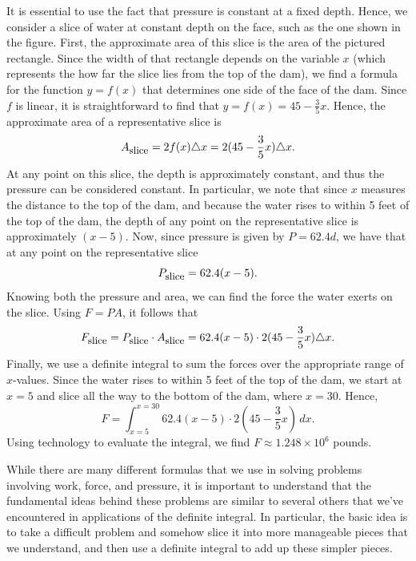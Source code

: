 It is essential to use the fact that pressure is constant at a fixed depth.  Hence, we consider a slice of water at constant depth on the face, such as the one shown in the figure.  First, the approximate area of this slice is the area of the pictured rectangle.  Since the width of that rectangle depends on the variable $x$ (which represents the how far the slice lies from the top of the dam), we find a formula for the function $y = f(x)$ that determines one side of the face of the dam.  Since $f$ is linear, it is straightforward to find that $y = f(x) = 45 - \frac{3}{5}x$.  Hence, the approximate area of a representative slice is
$$A_{\mbox{\small{slice}}} = 2 f(x) \triangle x = 2 (45 - \frac{3}{5}x) \triangle x.$$
At any point on this slice, the depth is approximately constant, and thus the pressure can be considered constant.  In particular, we note that since $x$ measures the distance to the top of the dam, and because the water rises to within 5 feet of the top of the dam, the depth of any point on the representative slice is approximately $(x-5)$.  Now, since pressure is given by $P = 62.4d$, we have that at any point on the representative slice
$$P_{\mbox{\small{slice}}} = 62.4(x-5).$$
Knowing both the pressure and area, we can find the force the water exerts on the slice.  Using $F = PA$, it follows that 
$$F_{\mbox{\small{slice}}} = P_{\mbox{\small{slice}}} \cdot A_{\mbox{\small{slice}}} = 62.4(x-5) \cdot 2 (45 - \frac{3}{5}x) \triangle x.$$
Finally, we use a definite integral to sum the forces over the appropriate range of $x$-values.  Since the water rises to within 5 feet of the top of the dam, we start at $x = 5$ and slice all the way to the bottom of the dam, where $x = 30$.  Hence,
$$F = \int_{x=5}^{x=30} 62.4(x-5) \cdot 2 (45 - \frac{3}{5}x) \, dx.$$
Using technology to evaluate the integral, we find $F \approx 1.248 \times 10^6$ pounds.
\afterex



While there are many different formulas that we use in solving problems involving work, force, and pressure, it is important to understand that the fundamental ideas behind these problems are similar to several others that we've encountered in applications of the definite integral.  In particular, the basic idea is to take a difficult problem and somehow slice it into more manageable pieces that we understand, and then use a definite integral to add up these simpler pieces.

